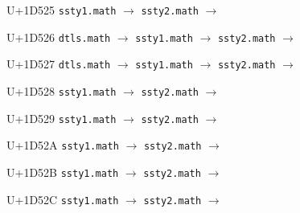 \documentclass{article}
\begin{document}
\begin{substitutions}
\goodbreak

U+1D525  \linebreak
    \texttt{ssty1.math} $\to$  \linebreak
    \texttt{ssty2.math} $\to$  

\goodbreak

U+1D526  \linebreak
    \texttt{dtls.math} $\to$  \linebreak
    \texttt{ssty1.math} $\to$  \linebreak
    \texttt{ssty2.math} $\to$  

\goodbreak

U+1D527  \linebreak
    \texttt{dtls.math} $\to$  \linebreak
    \texttt{ssty1.math} $\to$  \linebreak
    \texttt{ssty2.math} $\to$  

\goodbreak

U+1D528  \linebreak
    \texttt{ssty1.math} $\to$  \linebreak
    \texttt{ssty2.math} $\to$  

\goodbreak

U+1D529  \linebreak
    \texttt{ssty1.math} $\to$  \linebreak
    \texttt{ssty2.math} $\to$  

\goodbreak

U+1D52A  \linebreak
    \texttt{ssty1.math} $\to$  \linebreak
    \texttt{ssty2.math} $\to$  

\goodbreak

U+1D52B  \linebreak
    \texttt{ssty1.math} $\to$  \linebreak
    \texttt{ssty2.math} $\to$  

\goodbreak

U+1D52C  \linebreak
    \texttt{ssty1.math} $\to$  \linebreak
    \texttt{ssty2.math} $\to$  


\end{substitutions}
\end{document}
